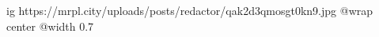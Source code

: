  
 
 
 
 

\ifcmt
  ig https://mrpl.city/uploads/posts/redactor/qak2d3qmosgt0kn9.jpg
  @wrap center
  @width 0.7
\fi
